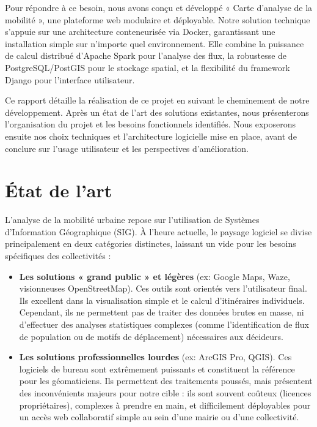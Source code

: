 \documentclass[french]{tai_info} %
\begin{document}
Pour répondre à ce besoin, nous avons conçu et développé « Carte d’analyse de la mobilité », une plateforme web modulaire et déployable. Notre solution technique s'appuie sur une architecture conteneurisée via Docker, garantissant une installation simple sur n'importe quel environnement. Elle combine la puissance de calcul distribué d'Apache Spark pour l'analyse des flux, la robustesse de PostgreSQL/PostGIS pour le stockage spatial, et la flexibilité du framework Django pour l'interface utilisateur.

Ce rapport détaille la réalisation de ce projet en suivant le cheminement de notre développement. Après un état de l'art des solutions existantes, nous présenterons l'organisation du projet et les besoins fonctionnels identifiés. Nous exposerons ensuite nos choix techniques et l'architecture logicielle mise en place, avant de conclure sur l'usage utilisateur et les perspectives d'amélioration.

\section{État de l'art}

L'analyse de la mobilité urbaine repose sur l'utilisation de Systèmes d'Information Géographique (SIG). À l'heure actuelle, le paysage logiciel se divise principalement en deux catégories distinctes, laissant un vide pour les besoins spécifiques des collectivités :

\begin{itemize}
    \item \textbf{Les solutions « grand public » et légères} (ex: Google Maps, Waze, visionneuses OpenStreetMap). 
    Ces outils sont orientés vers l'utilisateur final. Ils excellent dans la visualisation simple et le calcul d'itinéraires individuels. Cependant, ils ne permettent pas de traiter des données brutes en masse, ni d'effectuer des analyses statistiques complexes (comme l'identification de flux de population ou de motifs de déplacement) nécessaires aux décideurs. \newline
    
    \item \textbf{Les solutions professionnelles lourdes} (ex: ArcGIS Pro, QGIS). 
    Ces logiciels de bureau sont extrêmement puissants et constituent la référence pour les géomaticiens. Ils permettent des traitements poussés, mais présentent des inconvénients majeurs pour notre cible : ils sont souvent coûteux (licences propriétaires), complexes à prendre en main, et difficilement déployables pour un accès web collaboratif simple au sein d'une mairie ou d'une collectivité.
\end{itemize}
\end{document}
